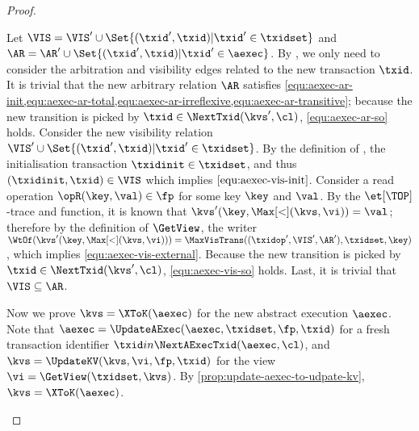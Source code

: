 \begin{proof}
\begin{enumerate}
\begin{enumerate}
\[        \]
        Let \( \VIS = \VIS' \cup \Set{(\txid',\txid) | \txid' \in \txidset } \)
        and \( \AR = \AR' \cup \Set{(\txid',\txid) | \txid' \in \aexec } \).
        By \ih, we only need to consider 
        the arbitration and visibility edges related to the new transaction \( \txid \).
        It is trivial that the new arbitrary relation \( \AR \) satisfies 
        \cref{equ:aexec-ar-init,equ:aexec-ar-total,equ:aexec-ar-irreflexive,equ:aexec-ar-transitive};
        because the new transition is picked by \( \txid \in \NextTxid(\kvs',\cl)\), 
        \cref{equ:aexec-ar-so} holds.
        Consider the new visibility relation \( \VIS' \cup \Set{(\txid',\txid) | \txid' \in \txidset } \).
        By the definition of \GetView, the initialisation transaction \( \txidinit \in \txidset \),
        and thus \( (\txidinit, \txid) \in \VIS \) which implies \( \cref{equ:aexec-vis-init}\).
        Consider a read operation \( \opR(\key,\val) \in \fp \) for some key \( \key \) and \( \val \).
        By the \( \et[\TOP] \)-trace and \UpdateKV function, 
        it is known that \( \kvs'(\key,\Max[<](\kvs,\vi)) = \val \);
        therefore by the definition of \(\GetView\), the writer
        \( \WtOf(\kvs'(\key,\Max[<](\kvs,\vi))) = \MaxVisTrans((\txidop',\VIS',\AR'),\txidset,\key)\),
        which implies \cref{equ:aexec-vis-external}.
        Because the new transition is picked by \( \txid \in \NextTxid(\kvs',\cl)\), 
        \cref{equ:aexec-vis-so} holds.
        Last, it is trivial that \( \VIS \subseteq \AR \).

        Now we prove \( \kvs = \XToK(\aexec) \) for the new abstract execution \( \aexec \).
        Note that \( \aexec = \UpdateAExec(\aexec,\txidset,\fp,\txid)\) 
        for a fresh transaction identifier \( \txid in \NextAExecTxid(\aexec,\cl) \),
        and \( \kvs = \UpdateKV(\kvs,\vi,\fp,\txid)\) for the view \( \vi = \GetView(\txidset,\kvs) \).
        By \cref{prop:update-aexec-to-udpate-kv}, \(\kvs = \XToK(\aexec) \). \qedhere
    \end{enumerate}
\end{enumerate}
\end{proof}
